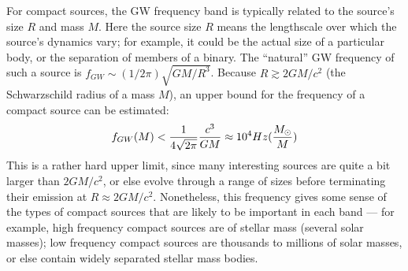 \documentclass[binding=0.6cm, LaM]{sapthesis}
\begin{document}
For compact sources, the GW frequency band is typically related to the source’s size $R$ and mass $M$. Here the source size $R$ means the lengthscale over which the source’s dynamics vary; for example, it could be the actual size of a particular body, or the separation of members of a binary. The “natural” GW frequency of such a source is $f_{GW} \sim (1/2\pi)\sqrt{GM/R^3}$. Because $R \apprge 2GM/c^2$ (the Schwarzschild radius of a mass $M$), an upper bound for the frequency of a compact source can be estimated:
\begin{equation}
f_{GW}(M) < {1 \over {4\sqrt{2 \pi}}}{{c^3}\over{GM}} \approx 10^4 Hz ({{M_{\odot}} \over M})
\end{equation}
This is a rather hard upper limit, since many interesting sources are quite a bit larger than $2GM/c^2$, or else evolve through a range of sizes before terminating their emission at $R \approx 2GM/c^2$. Nonetheless, this frequency gives some sense of the types of compact sources that are likely to be important in each band — for example, high frequency compact sources are of stellar mass (several solar masses); low frequency compact sources are thousands to millions of solar masses, or else contain widely separated stellar mass bodies.
\end{document}
